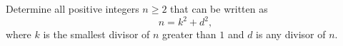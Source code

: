 Determine all positive integers $n\geq 2$ that can be written as
$$n =  k^2 + d^2,$$
where $k$ is the smallest divisor of $n$ greater than $1$ and $d$ is any divisor of $n$.
